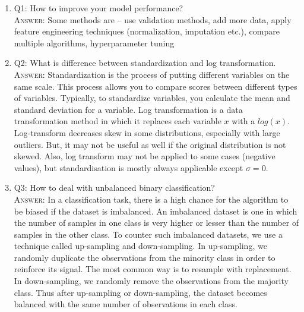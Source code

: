 \documentclass[11pt]{article}
\begin{document}
\begin{enumerate}

\item Q1: How to improve your model performance?  \\
\textsc{Answer:} Some methods are -- use validation methods, add more data, apply feature engineering techniques (normalization, imputation etc.), compare multiple algorithms, hyperparameter tuning 

\item Q2: What is difference between standardization and log transformation. \\
\textsc{Answer:} Standardization is the process of putting different variables on the same scale. This process allows you to compare scores between different types of variables. Typically, to standardize variables, you calculate the mean and standard deviation for a variable. Log transformation is a data transformation method in which it replaces each variable $x$ with a $log(x)$. Log-transform decreases skew in some distributions, especially with large outliers. But, it may not be useful as well if the original distribution is not skewed. Also, log transform may not be applied to some cases (negative values), but standardisation is mostly always applicable except $\sigma = 0$. 

\item Q3: How to deal with unbalanced binary classification? \\
\textsc{Answer:} In a classification task, there is a high chance for the algorithm to be biased if the dataset is imbalanced. An imbalanced dataset is one in which the number of samples in one class is very higher or lesser than the number of samples in the other class. 
To counter such imbalanced datasets, we use a technique called up-sampling and down-sampling. In up-sampling, we randomly duplicate the observations from the minority class in order to reinforce its signal. The most common way is to resample with replacement. In down-sampling, we randomly remove the observations from the majority class. Thus after up-sampling or down-sampling, the dataset becomes balanced with the same number of observations in each class.

\end{enumerate}
















	
	\newpage
	
	
\end{document}
